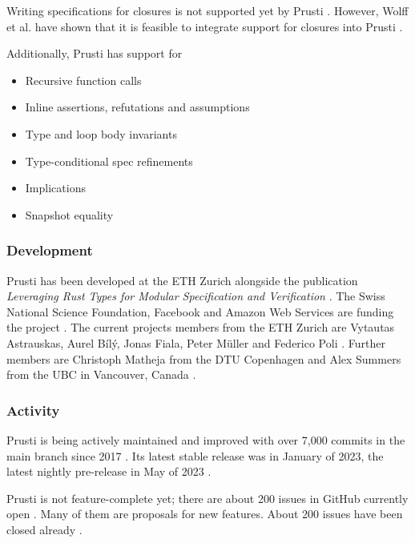 Writing specifications for closures is not supported yet by Prusti \cite{prusti_user_guide_closures_2023}. However, Wolff et al. have shown that it is feasible to integrate support for closures into Prusti \cite{wolff_modular_2021}.

Additionally, Prusti has support for
\begin{itemize}
    \item Recursive function calls \cite{deshmukh_prusti_2022}
    \item Inline assertions, refutations and assumptions \cite{prusti_user_guide_assertions_2023}
    \item Type and loop body invariants \cite{deshmukh_prusti_2022}
    \item Type-conditional spec refinements \cite{prusti_user_guide_type-conditional_2023}
    \item Implications \cite{prusti_user_guide_specification_2023}
    \item Snapshot equality \cite{prusti_user_guide_specification_2023}
\end{itemize}

\subsubsection{Development}
Prusti has been developed at the ETH Zurich alongside the publication \textit{Leveraging Rust Types for Modular Specification and Verification} \cite{astrauskas_leveraging_2019}. The Swiss National Science Foundation, Facebook and Amazon Web Services are funding the project \cite{eth_zurich_prusti_2023}. The current projects members from the ETH Zurich are Vytautas Astrauskas, Aurel Bílý, Jonas Fiala, Peter Müller and Federico Poli \cite{eth_zurich_prusti_2023}. Further members are Christoph Matheja from the DTU Copenhagen and Alex Summers from the UBC in Vancouver, Canada \cite{eth_zurich_prusti_2023}.

\subsubsection{Activity}
Prusti is being actively maintained and improved with over 7,000 commits in the main branch since 2017 \cite{eth_zurich_viperprojectprusti-dev_2023}. Its latest stable release was in January of 2023, the latest nightly pre-release in May of 2023 \cite{eth_zurich_releases_2023}. 

Prusti is not feature-complete yet; there are about 200 issues in GitHub currently open \cite{eth_zurich_issues_2023}. Many of them are proposals for new features. About 200 issues have been closed already \cite{eth_zurich_issues_2023}.

